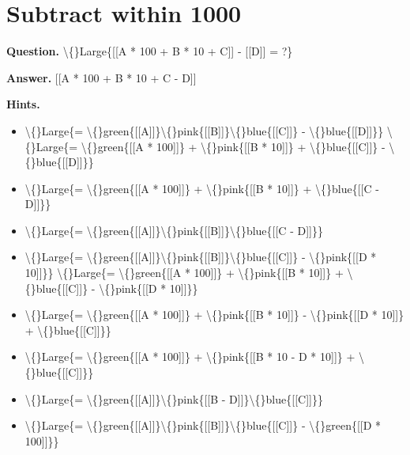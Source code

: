 \documentclass{article}
\begin{document}
\section*{Subtract within 1000}
\textbf{Question.} \textbackslash\{\}Large\{[[A * 100 + B * 10 + C]] - [[D]] = ?\}

\textbf{Answer.} [[A * 100 + B * 10 + C - D]]

\textbf{Hints.}
\begin{itemize}
  \item \textbackslash\{\}Large\{= \textbackslash\{\}green\{[[A]]\}\textbackslash\{\}pink\{[[B]]\}\textbackslash\{\}blue\{[[C]]\} - \textbackslash\{\}blue\{[[D]]\}\}
                        \textbackslash\{\}Large\{= \textbackslash\{\}green\{[[A * 100]]\} + \textbackslash\{\}pink\{[[B * 10]]\} + \textbackslash\{\}blue\{[[C]]\} - \textbackslash\{\}blue\{[[D]]\}\}
  \item \textbackslash\{\}Large\{= \textbackslash\{\}green\{[[A * 100]]\} + \textbackslash\{\}pink\{[[B * 10]]\} + \textbackslash\{\}blue\{[[C - D]]\}\}
  \item \textbackslash\{\}Large\{= \textbackslash\{\}green\{[[A]]\}\textbackslash\{\}pink\{[[B]]\}\textbackslash\{\}blue\{[[C - D]]\}\}
  \item \textbackslash\{\}Large\{= \textbackslash\{\}green\{[[A]]\}\textbackslash\{\}pink\{[[B]]\}\textbackslash\{\}blue\{[[C]]\} - \textbackslash\{\}pink\{[[D * 10]]\}\}
                        \textbackslash\{\}Large\{= \textbackslash\{\}green\{[[A * 100]]\} + \textbackslash\{\}pink\{[[B * 10]]\} + \textbackslash\{\}blue\{[[C]]\} - \textbackslash\{\}pink\{[[D * 10]]\}\}
  \item \textbackslash\{\}Large\{= \textbackslash\{\}green\{[[A * 100]]\} + \textbackslash\{\}pink\{[[B * 10]]\} - \textbackslash\{\}pink\{[[D * 10]]\} + \textbackslash\{\}blue\{[[C]]\}\}
  \item \textbackslash\{\}Large\{= \textbackslash\{\}green\{[[A * 100]]\} + \textbackslash\{\}pink\{[[B * 10 - D * 10]]\} + \textbackslash\{\}blue\{[[C]]\}\}
  \item \textbackslash\{\}Large\{= \textbackslash\{\}green\{[[A]]\}\textbackslash\{\}pink\{[[B - D]]\}\textbackslash\{\}blue\{[[C]]\}\}
  \item \textbackslash\{\}Large\{= \textbackslash\{\}green\{[[A]]\}\textbackslash\{\}pink\{[[B]]\}\textbackslash\{\}blue\{[[C]]\} - \textbackslash\{\}green\{[[D * 100]]\}\}
                        

\end{itemize}
\end{document}
